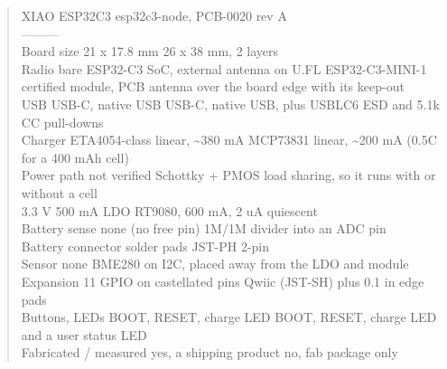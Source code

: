 \documentclass[11pt]{article}
\begin{document}
\begin{quote}\small\ttfamily\raggedright
\textbar{} \textbar{} XIAO ESP32C3 \textbar{} esp32c3-node, PCB-0020 rev A \textbar{}\\
\textbar{}---\textbar{}---\textbar{}---\textbar{}\\
\textbar{} Board size \textbar{} 21 x 17.8 mm \textbar{} 26 x 38 mm, 2 layers \textbar{}\\
\textbar{} Radio \textbar{} bare ESP32-C3 SoC, external antenna on U.FL \textbar{} ESP32-C3-MINI-1 certified module, PCB antenna over the board edge with its keep-out \textbar{}\\
\textbar{} USB \textbar{} USB-C, native USB \textbar{} USB-C, native USB, plus USBLC6 ESD and 5.1k CC pull-downs \textbar{}\\
\textbar{} Charger \textbar{} ETA4054-class linear, \textasciitilde{}380 mA \textbar{} MCP73831 linear, \textasciitilde{}200 mA (0.5C for a 400 mAh cell) \textbar{}\\
\textbar{} Power path \textbar{} not verified \textbar{} Schottky + PMOS load sharing, so it runs with or without a cell \textbar{}\\
\textbar{} 3.3 V \textbar{} 500 mA LDO \textbar{} RT9080, 600 mA, 2 uA quiescent \textbar{}\\
\textbar{} Battery sense \textbar{} none (no free pin) \textbar{} 1M/1M divider into an ADC pin \textbar{}\\
\textbar{} Battery connector \textbar{} solder pads \textbar{} JST-PH 2-pin \textbar{}\\
\textbar{} Sensor \textbar{} none \textbar{} BME280 on I2C, placed away from the LDO and module \textbar{}\\
\textbar{} Expansion \textbar{} 11 GPIO on castellated pins \textbar{} Qwiic (JST-SH) plus 0.1 in edge pads \textbar{}\\
\textbar{} Buttons, LEDs \textbar{} BOOT, RESET, charge LED \textbar{} BOOT, RESET, charge LED and a user status LED \textbar{}\\
\textbar{} Fabricated / measured \textbar{} yes, a shipping product \textbar{} no, fab package only \textbar{}
\end{quote}
\end{document}
